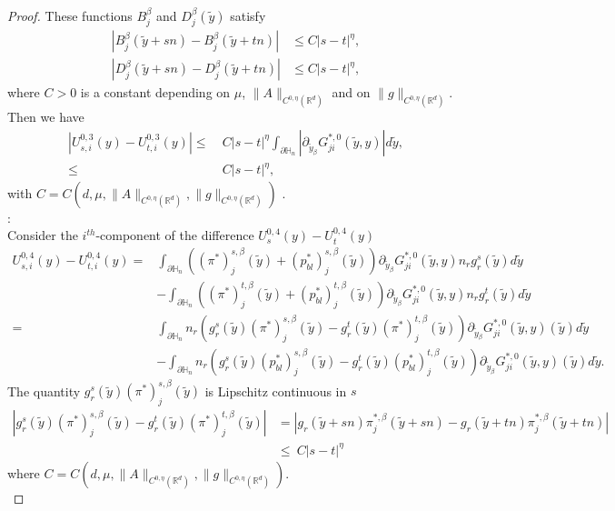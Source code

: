 \documentclass[11pt, reqno]{amsart}
\theoremstyle{definition}
\theoremstyle{remark}
\numberwithin{equation}{section}
\begin{document}
\begin{proof}[Proof]
		\noindent	These functions  $B_j^{\beta}$ and   $D_j^{\beta}(\tilde{y})$   satisfy   
		\begin{align*}
			|B^{\beta}_{j}\left(\tilde{y}+sn \right) -B^{\beta}_{j}\left(\tilde{y}+tn \right)| &\leq C |s-t|^\eta , \\
			|D^{\beta}_{j}\left(\tilde{y}+sn \right) -D^{\beta}_{j}\left(\tilde{y}+tn \right)|&\leq  C  |s-t|^\eta ,
		\end{align*}
		where $C>0$ is a constant depending on $\mu$, $\|A\|_{C^{0,\eta}(\mathbb{R}^d)}$ and on  $\|g\|_{C^{0,\eta}(\mathbb{R}^d)}$. Then we have 
		\begin{align*}
			|U_{s,i}^{0,3}(y)- 	U_{t,i}^{0,3}(y)|
			\leq &\: C  |s-t|^\eta \int_{\partial\mathbb{H}_n} |\partial_{ \tilde{y}_\beta} G^{*,0}_{ji}(\tilde{y},y)| d\tilde{y},\\
			\leq &\: C  |s-t|^\eta ,
		\end{align*}
		with $C=C(d,\mu,\|A\|_{C^{0,\eta}(\mathbb{R}^d)},\|g\|_{C^{0,\eta}(\mathbb{R}^d)})$ .\\
		
		:\\
		Consider the $i^{th}$-component of the difference 	$U_{s}^{0,4}(y)-U_{t}^{0,4}(y)$
		\begin{align*}
			U_{s,i}^{0,4}(y)-U_{t,i}^{0,4}(y)=& \int_{\partial\mathbb{H}_n}\left( (\pi^{*})_{j}^{s,\beta}(\tilde{y})+(p_{bl}^{*})_{j}^{s,\beta}(\tilde{y}) \right) \partial_{\tilde{y}_\beta} G_{ji}^{*,0}(\tilde{y}, y) n_r  g^s_r(\tilde{y}) d\tilde{y} \\
			&  - \int_{\partial\mathbb{H}_n}    \left( (\pi^{*})_{j}^{t,\beta}(\tilde{y})+(p_{bl}^{*})_{j}^{t,\beta}(\tilde{y}) \right)  \partial_{\tilde{y}_\beta} G_{ji}^{*,0}(\tilde{y}, y) n_r  g^t_r(\tilde{y}) d\tilde{y} \\
			=& \int_{\partial\mathbb{H}_n}n_r \left( g^s_r (\tilde{y}) (\pi^{*})_{j}^{s,\beta}(\tilde{y})-g^t_r (\tilde{y}) (\pi^{*})_{j}^{t,\beta}(\tilde{y}) \right) \partial_{\tilde{y}_\beta} G_{ji}^{*,0}(\tilde{y}, y) (\tilde{y}) d\tilde{y} \\
			&  - \int_{\partial\mathbb{H}_n} n_r \left( g^s_r (\tilde{y}) (p_{bl}^{*})_{j}^{s,\beta}(\tilde{y})-g^t_r (\tilde{y}) (p_{bl}^{*})_{j}^{t,\beta}(\tilde{y}) \right) \partial_{\tilde{y}_\beta} G_{ji}^{*,0}(\tilde{y}, y) (\tilde{y})   d\tilde{y} .
		\end{align*}
		The quantity  $g^s_r (\tilde{y}) (\pi^{*})_{j}^{s,\beta}(\tilde{y})$  is Lipschitz continuous in $s$
		\begin{align*}
			|g^s_r (\tilde{y}) (\pi^{*})_{j}^{s,\beta}(\tilde{y})-g^t_r (\tilde{y}) (\pi^{*})_{j}^{t,\beta}(\tilde{y}) | &= |g_r (\tilde{y}+sn) \pi_{j}^{*,\beta}(\tilde{y}+sn )-g_r (\tilde{y}+tn) \pi_{j}^{*,\beta}(\tilde{y}+tn) | \\
			&\leq \: C |s-t|^\eta
		\end{align*}
	where 	$C=C(d,\mu,\|A\|_{C^{0,\eta}(\mathbb{R}^d)},\|g\|_{C^{0,\eta}(\mathbb{R}^d)}).$ \\
		

\end{proof}
\end{document}
